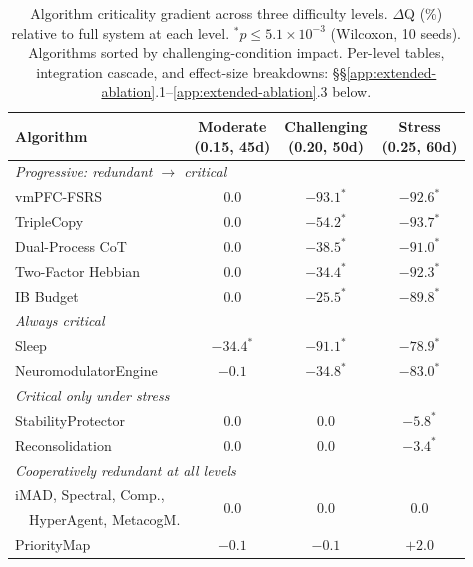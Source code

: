 \documentclass{article}
\begin{document}
\begin{table}[h]
    \caption{Algorithm criticality gradient across three difficulty levels.
    $\Delta$Q (\%) relative to full system at each level.
    $^\ast p \le 5.1\times 10^{-3}$ (Wilcoxon, 10 seeds).
    Algorithms sorted by challenging-condition impact.
    Per-level tables, integration cascade, and effect-size breakdowns:
    \S\S\ref{app:extended-ablation}.1--\ref{app:extended-ablation}.3 below.}
    \label{tab:gradient}
    \centering
    \small
    \begin{tabular}{lccc}
        \toprule
        Algorithm & \makecell{Moderate\\(0.15, 45d)} & \makecell{Challenging\\(0.20, 50d)} & \makecell{Stress\\(0.25, 60d)} \\
        \midrule
        \multicolumn{4}{l}{\textit{Progressive: redundant $\to$ critical}} \\
        vmPFC-FSRS & $0.0$ & $-93.1^\ast$ & $-92.6^\ast$ \\
        TripleCopy & $0.0$ & $-54.2^\ast$ & $-93.7^\ast$ \\
        Dual-Process CoT & $0.0$ & $-38.5^\ast$ & $-91.0^\ast$ \\
        Two-Factor Hebbian & $0.0$ & $-34.4^\ast$ & $-92.3^\ast$ \\
        IB Budget & $0.0$ & $-25.5^\ast$ & $-89.8^\ast$ \\
        \midrule
        \multicolumn{4}{l}{\textit{Always critical}} \\
        Sleep & $-34.4^\ast$ & $-91.1^\ast$ & $-78.9^\ast$ \\
        NeuromodulatorEngine & $-0.1$ & $-34.8^\ast$ & $-83.0^\ast$ \\
        \midrule
        \multicolumn{4}{l}{\textit{Critical only under stress}} \\
        StabilityProtector & $0.0$ & $0.0$ & $-5.8^\ast$ \\
        Reconsolidation & $0.0$ & $0.0$ & $-3.4^\ast$ \\
        \midrule
        \multicolumn{4}{l}{\textit{Cooperatively redundant at all levels}} \\
        iMAD, Spectral, Comp., & \multirow{2}{*}{$0.0$} & \multirow{2}{*}{$0.0$} & \multirow{2}{*}{$0.0$} \\
        ~~HyperAgent, MetacogM. & & & \\
        PriorityMap & $-0.1$ & $-0.1$ & $+2.0$ \\
        \bottomrule
    \end{tabular}
\end{table}
\end{document}
